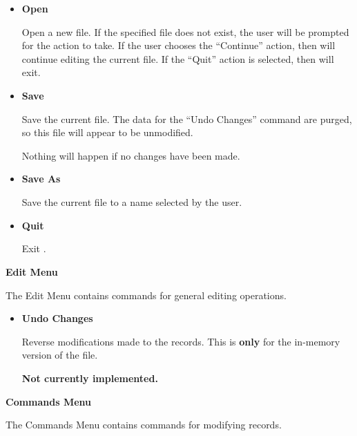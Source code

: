 \begin{itemize}

\item {\bf Open}\verb" "

Open a new  file.  If the specified file does not exist, the
user will be prompted for the action to take.  If the user chooses the
``Continue'' action, then  will continue editing the
current  file.  If the ``Quit'' action is selected, then
 will exit.

\item {\bf Save}\verb" "

Save the current  file.  The data for the ``Undo Changes''
command are purged, so this file will appear to be unmodified.

Nothing will happen if no changes have been made.

\item {\bf Save As}\verb" "

Save the current  file to a name selected by the user.

\item {\bf Quit}\verb" "

Exit .

\end{itemize}

{\bf Edit Menu}

The Edit Menu contains commands for general editing operations.

\begin{itemize}

\item {\bf Undo Changes}\verb" "

Reverse modifications made to the  records.  This is {\bf only}
for the in-memory version of the  file.

{\bf Not currently implemented.}

\end{itemize}

{\bf Commands Menu}

The Commands Menu contains commands for modifying  records.

